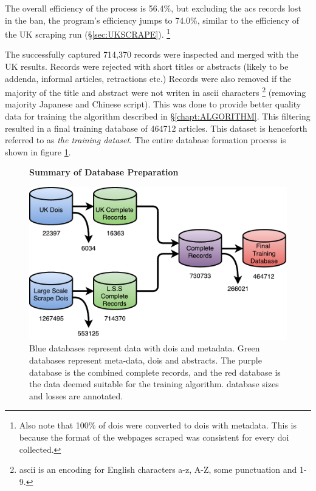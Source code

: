 The overall efficiency of the process is 56.4\%, but excluding the acs records lost in the ban, the program's efficiency jumps to 74.0\%, similar to the efficiency of the UK scraping run (\S\ref{sec:UKSCRAPE}). \footnote{Also note that 100\% of dois were converted to dois with metadata. This is because the format of the webpages scraped was consistent for every doi collected.}

The successfully captured 714,370 records were inspected and merged with the UK results. Records were rejected with short titles or abstracts (likely to be addenda, informal articles, retractions etc.) Records were also removed if the majority of the title and abstract were not writen in ascii characters \footnote{ascii is an encoding for English characters a-z, A-Z, some punctuation and 1-9.} (removing majority Japanese and Chinese script). This was done to provide better quality data for training the algorithm described in  \S\ref{chapt:ALGORITHM}. This filtering resulted in a final training database of 464712 articles. This dataset is henceforth referred to as \emph{the training dataset}. The entire database formation process is shown in figure \ref{fig:DATABASES}.
\begin{figure}[H]
    \centering
    \textbf{Summary of Database Preparation}\par\medskip
    \includegraphics[scale=0.6]{Data_Acquisition/Databases.pdf}
    \caption[Summary of Database Preparation]{Blue databases represent data with dois and metadata. Green databases represent meta-data, dois and abstracts. The purple database is the combined complete records, and the red database is the data deemed suitable for the training algorithm. database sizes and losses are annotated.}
     \label{fig:DATABASES}
\end{figure}


